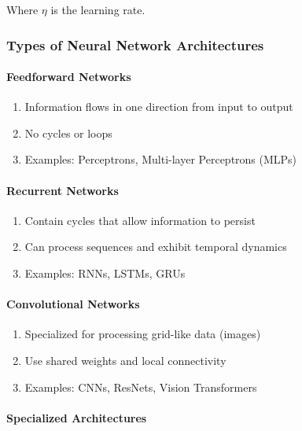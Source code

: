 Where $\eta$ is the learning rate.

\subsubsection{Types of Neural Network Architectures}
\label{subsubsec:types-nn-architectures}

\paragraph{Feedforward Networks}
\label{para:feedforward-networks}

\begin{enumerate}
\item Information flows in one direction from input to output
\item No cycles or loops
\item Examples: Perceptrons, Multi-layer Perceptrons (MLPs)
\end{enumerate}

\paragraph{Recurrent Networks}
\label{para:recurrent-networks}

\begin{enumerate}
\item Contain cycles that allow information to persist
\item Can process sequences and exhibit temporal dynamics
\item Examples: RNNs, LSTMs, GRUs
\end{enumerate}

\paragraph{Convolutional Networks}
\label{para:convolutional-networks}

\begin{enumerate}
\item Specialized for processing grid-like data (images)
\item Use shared weights and local connectivity
\item Examples: CNNs, ResNets, Vision Transformers
\end{enumerate}

\paragraph{Specialized Architectures}
\label{para:specialized-architectures}

